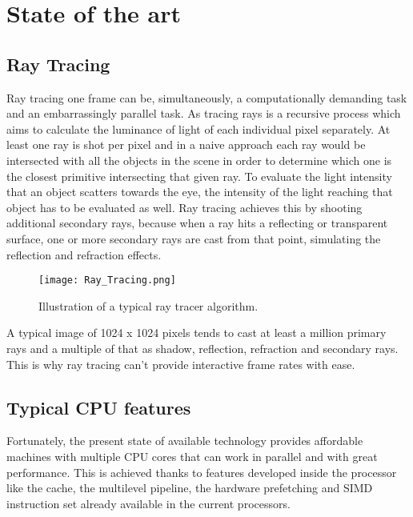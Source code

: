 \chapter{State of the art}

\section{Ray Tracing}

\par
Ray tracing one frame can be, simultaneously, a computationally demanding task and an embarrassingly parallel task.
As tracing rays is a recursive process which aims to calculate the luminance of light of each individual pixel separately.
At least one ray is shot per pixel and in a naive approach each ray would be intersected with all the objects in the scene in order to determine which one is the closest primitive intersecting that given ray.
To evaluate the light intensity that an object scatters towards the eye, the intensity of the light reaching that object has to be evaluated as well.
Ray tracing achieves this by shooting additional secondary rays, because when a ray hits a reflecting or transparent surface, one or more secondary rays are cast from that point, simulating the reflection and refraction effects.

\begin{figure}[H]
	\centering
	\caption{Illustration of a typical ray tracer algorithm.}
	\label{Illustration of a typical ray tracer algorithm.}
	\texttt{[image: Ray\_Tracing.png]}
\end{figure}

\par
A typical image of 1024 x 1024 pixels tends to cast at least a million primary rays and a multiple of that as shadow, reflection, refraction and secondary rays.
This is why ray tracing can't provide interactive frame rates with ease.

\section{Typical CPU features}

\par
Fortunately, the present state of available technology provides affordable machines with multiple CPU cores that can work in parallel and with great performance.
This is achieved thanks to features developed inside the processor like the cache, the multilevel pipeline, the hardware prefetching and SIMD instruction set already available in the current processors.

